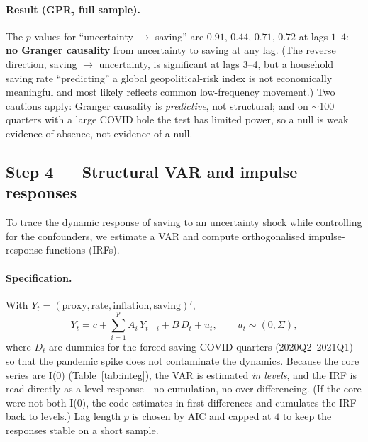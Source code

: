 \documentclass[11pt,a4paper]{article}
\begin{document}
\paragraph{Result (GPR, full sample).} The $p$-values for ``uncertainty $\to$
saving'' are $0.91,\,0.44,\,0.71,\,0.72$ at lags $1$--$4$: \textbf{no Granger
causality} from uncertainty to saving at any lag. (The reverse direction,
saving $\to$ uncertainty, is significant at lags 3--4, but a household saving
rate ``predicting'' a global geopolitical-risk index is not economically
meaningful and most likely reflects common low-frequency movement.) Two cautions
apply: Granger causality is \emph{predictive}, not structural; and on $\sim$100
quarters with a large COVID hole the test has limited power, so a null is weak
evidence of absence, not evidence of a null.

\subsection{Step 4 --- Structural VAR and impulse responses}
To trace the dynamic response of saving to an uncertainty shock while
controlling for the confounders, we estimate a VAR and compute orthogonalised
impulse-response functions (IRFs).

\paragraph{Specification.} With $Y_t=(\text{proxy},\text{rate},\text{inflation},
\text{saving})'$,
\begin{equation}
  Y_t = c + \sum_{i=1}^{p} A_i\,Y_{t-i} + B\,D_t + u_t,
  \qquad u_t \sim (0,\Sigma),
\end{equation}
where $D_t$ are dummies for the forced-saving COVID quarters (2020Q2--2021Q1) so
that the pandemic spike does not contaminate the dynamics. Because the core
series are I(0) (Table~\ref{tab:integ}), the VAR is estimated \emph{in levels},
and the IRF is read directly as a level response---no cumulation, no
over-differencing. (If the core were not both I(0), the code estimates in first
differences and cumulates the IRF back to levels.) Lag length $p$ is chosen by
AIC and capped at $4$ to keep the responses stable on a short sample.
\end{document}
